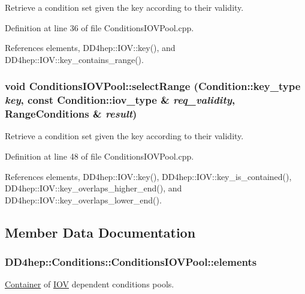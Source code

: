 Retrieve a condition set given the key according to their validity. 

Definition at line 36 of file ConditionsIOVPool.cpp.

References elements, DD4hep::IOV::key(), and DD4hep::IOV::key\_\-contains\_\-range().\hypertarget{class_d_d4hep_1_1_conditions_1_1_conditions_i_o_v_pool_a09fb206aaa3c86d249598b7eaa58b322}{
\subsubsection[{selectRange}]{\setlength{\rightskip}{0pt plus 5cm}void ConditionsIOVPool::selectRange ({\bf Condition::key\_\-type} {\em key}, \/  const {\bf Condition::iov\_\-type} \& {\em req\_\-validity}, \/  {\bf RangeConditions} \& {\em result})}}
\label{class_d_d4hep_1_1_conditions_1_1_conditions_i_o_v_pool_a09fb206aaa3c86d249598b7eaa58b322}


Retrieve a condition set given the key according to their validity. 

Definition at line 48 of file ConditionsIOVPool.cpp.

References elements, DD4hep::IOV::key(), DD4hep::IOV::key\_\-is\_\-contained(), DD4hep::IOV::key\_\-overlaps\_\-higher\_\-end(), and DD4hep::IOV::key\_\-overlaps\_\-lower\_\-end().

\subsection{Member Data Documentation}
\hypertarget{class_d_d4hep_1_1_conditions_1_1_conditions_i_o_v_pool_adf0b418e513769d438a8c91d766e86f4}{
\subsubsection[{elements}]{ {\bf DD4hep::Conditions::ConditionsIOVPool::elements}}}
\label{class_d_d4hep_1_1_conditions_1_1_conditions_i_o_v_pool_adf0b418e513769d438a8c91d766e86f4}


\hyperlink{class_d_d4hep_1_1_conditions_1_1_container}{Container} of \hyperlink{class_d_d4hep_1_1_i_o_v}{IOV} dependent conditions pools. 

